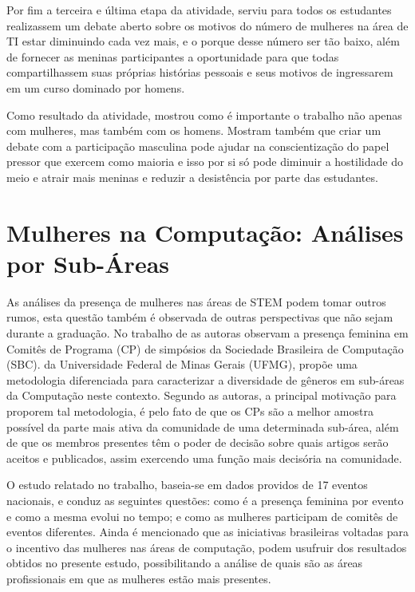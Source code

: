 Por fim a terceira e última etapa da atividade, serviu para todos os estudantes realizassem um debate aberto sobre os motivos do número de mulheres na área de TI estar diminuindo cada vez mais, e o porque desse número ser tão baixo, além de fornecer as meninas participantes a oportunidade para que todas compartilhassem suas próprias histórias pessoais e seus motivos de ingressarem em um curso dominado por homens. 

Como resultado da atividade, mostrou como é importante o trabalho não apenas com mulheres, mas também com os homens. Mostram também que criar um debate com a participação masculina pode ajudar na conscientização do papel pressor que exercem como maioria e isso por si só pode diminuir a hostilidade do meio e atrair mais meninas e reduzir a desistência por parte das estudantes. 


\section{Mulheres na Computação: Análises por Sub-Áreas }\label{sec:subareas}

As análises da presença de mulheres nas áreas de STEM podem tomar outros rumos, esta questão também é observada de outras perspectivas que não sejam durante a graduação. No trabalho de  as autoras observam a presença feminina em Comitês de Programa (CP) de simpósios da Sociedade Brasileira de Computação (SBC).  da Universidade Federal de Minas Gerais (UFMG), propõe uma metodologia diferenciada para caracterizar a diversidade de gêneros em sub-áreas da Computação neste contexto. Segundo as autoras, a principal motivação para proporem tal metodologia, é pelo fato de que os CPs são a melhor amostra possível da parte mais ativa da comunidade de uma determinada sub-área, além de que os membros presentes têm o poder de decisão sobre quais artigos serão aceitos e publicados, assim exercendo uma função mais decisória na comunidade.

O estudo relatado no trabalho, baseia-se em dados providos de 17 eventos nacionais, e conduz as seguintes questões: como é a presença feminina por evento e como a mesma evolui no tempo; e como as mulheres participam de comitês de eventos diferentes. Ainda é mencionado que as iniciativas brasileiras voltadas para o incentivo das mulheres nas áreas de computação, podem usufruir dos resultados obtidos no presente estudo, possibilitando a análise de quais são as áreas profissionais em que as mulheres estão mais presentes.

